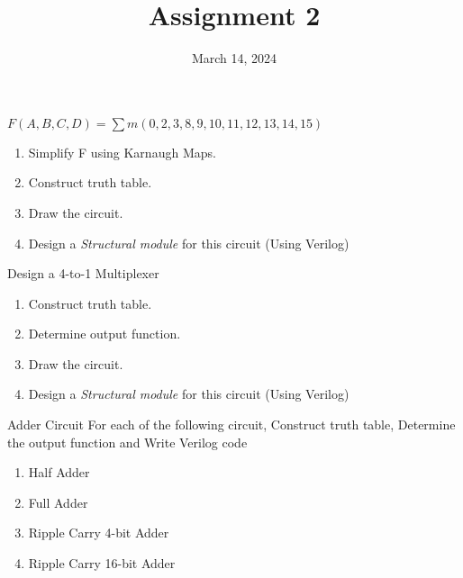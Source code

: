 \documentclass{vhdl-assignment}
\title{Assignment 2}
\date{March 14, 2024}
\begin{document}
\maketitle
\thispagestyle{fancy}

\begin{problem}{}
    $F(A,B,C,D)=\sum m(0,2,3,8,9,10,11,12,13,14,15)$
    \begin{enumerate}
        \item Simplify F using Karnaugh Maps.
        \item Construct truth table.
        \item Draw the circuit.
        \item Design a \emph{Structural module} for this circuit (Using Verilog)
    \end{enumerate}
\end{problem}

\begin{problem}{Design a 4-to-1 Multiplexer}
    \begin{enumerate}
        \item Construct truth table.
        \item Determine output function.
        \item Draw the circuit.
        \item Design a \emph{Structural module} for this circuit (Using Verilog)
    \end{enumerate}
\end{problem}

\begin{problem}{Adder Circuit}
    For each of the following circuit, Construct truth table, Determine the output function and Write Verilog code 
    \begin{enumerate}
        \item Half Adder
        \item Full Adder
        \item Ripple Carry 4-bit Adder
        \item Ripple Carry 16-bit Adder
    \end{enumerate}
\end{problem}
\end{document}
